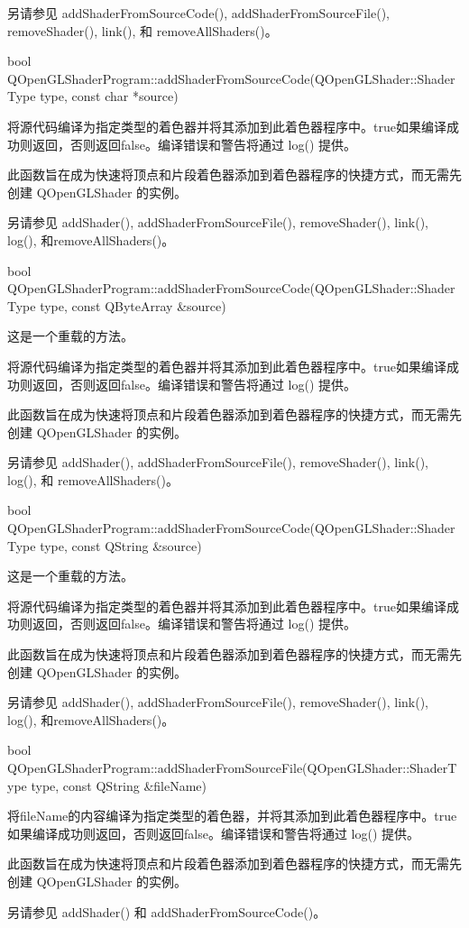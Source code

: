 另请参见 addShaderFromSourceCode(), addShaderFromSourceFile(), removeShader(), link(), 和 removeAllShaders()。

bool QOpenGLShaderProgram::addShaderFromSourceCode(QOpenGLShader::ShaderType type, const char *source)

将源代码编译为指定类型的着色器并将其添加到此着色器程序中。true如果编译成功则返回，否则返回false。编译错误和警告将通过 log() 提供。

此函数旨在成为快速将顶点和片段着色器添加到着色器程序的快捷方式，而无需先创建 QOpenGLShader 的实例。

另请参见 addShader(), addShaderFromSourceFile(), removeShader(), link(), log(), 和removeAllShaders()。

bool QOpenGLShaderProgram::addShaderFromSourceCode(QOpenGLShader::ShaderType type, const QByteArray \&source)

这是一个重载的方法。

将源代码编译为指定类型的着色器并将其添加到此着色器程序中。true如果编译成功则返回，否则返回false。编译错误和警告将通过 log() 提供。

此函数旨在成为快速将顶点和片段着色器添加到着色器程序的快捷方式，而无需先创建 QOpenGLShader 的实例。

另请参见 addShader(), addShaderFromSourceFile(), removeShader(), link(), log(), 和 removeAllShaders()。

bool QOpenGLShaderProgram::addShaderFromSourceCode(QOpenGLShader::ShaderType type, const QString \&source)

这是一个重载的方法。

将源代码编译为指定类型的着色器并将其添加到此着色器程序中。true如果编译成功则返回，否则返回false。编译错误和警告将通过 log() 提供。

此函数旨在成为快速将顶点和片段着色器添加到着色器程序的快捷方式，而无需先创建 QOpenGLShader 的实例。

另请参见 addShader(), addShaderFromSourceFile(), removeShader(), link(), log(), 和removeAllShaders()。

bool QOpenGLShaderProgram::addShaderFromSourceFile(QOpenGLShader::ShaderType type, const QString \&fileName)

将fileName的内容编译为指定类型的着色器，并将其添加到此着色器程序中。true如果编译成功则返回，否则返回false。编译错误和警告将通过 log() 提供。

此函数旨在成为快速将顶点和片段着色器添加到着色器程序的快捷方式，而无需先创建 QOpenGLShader 的实例。

另请参见 addShader() 和 addShaderFromSourceCode()。

